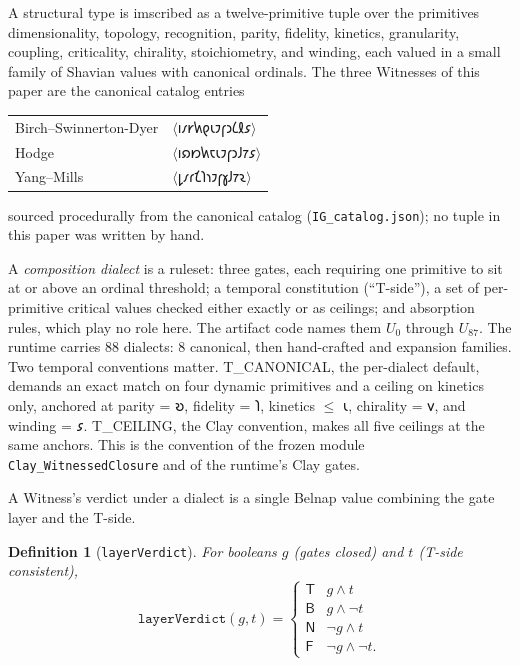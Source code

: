 \documentclass[12pt,a4paper]{article}
\newtheorem{definition}[theorem]{Definition}
\newcommand{\shav}[1]{{\shavfont #1}}
\newcommand{\igtuple}[1]{\ensuremath{\langle}{\shavfont #1}\ensuremath{\rangle}}
\newcommand{\bN}{\textsf{N}}
\newcommand{\bT}{\textsf{T}}
\newcommand{\bF}{\textsf{F}}
\newcommand{\bB}{\textsf{B}}
\begin{document}
A structural type is imscribed as a twelve-primitive tuple over the primitives
dimensionality, topology, recognition, parity, fidelity, kinetics, granularity,
coupling, criticality, chirality, stoichiometry, and winding, each valued in a
small family of Shavian values with canonical ordinals.  The three Witnesses of
this paper are the canonical catalog entries
\begin{center}
\begin{tabular}{ll}
Birch--Swinnerton-Dyer & \igtuple{𐑦𐑥𐑾𐑿𐑞𐑧𐑲𐑝𐑮𐑖𐑙𐑭}\\
Hodge & \igtuple{𐑦𐑸𐑽𐑿𐑱𐑧𐑲𐑝𐑮𐑓𐑳𐑭}\\
Yang--Mills & \igtuple{𐑛𐑥𐑩𐑗𐑐𐑪𐑲𐑝𐑣𐑓𐑳𐑷}
\end{tabular}
\end{center}
sourced procedurally from the canonical catalog (\texttt{IG\_catalog.json});
no tuple in this paper was written by hand.

A \emph{composition dialect} is a ruleset: three gates, each requiring one
primitive to sit at or above an ordinal threshold; a temporal constitution
(``T-side''), a set of per-primitive critical values checked either exactly or
as ceilings; and absorption rules, which play no role here.  The artifact code
names them $U_0$ through $U_{87}$.  The runtime carries
$88$ dialects: $8$ canonical, then hand-crafted and expansion families.  Two
temporal conventions matter.  T\_CANONICAL, the per-dialect default, demands an
exact match on four dynamic primitives and a ceiling on kinetics only, anchored
at parity = \shav{𐑹}, fidelity = \shav{𐑐}, kinetics $\le$ \shav{𐑧},
chirality = \shav{𐑫}, and winding = \shav{𐑭}.  T\_CEILING, the Clay
convention, makes all five ceilings at the same anchors.  This is the convention
of the frozen module \texttt{Clay\_WitnessedClosure} and of the runtime's Clay
gates.

A Witness's verdict under a dialect is a single Belnap value combining the gate
layer and the T-side.

\begin{definition}[\texttt{layerVerdict}]
\label{def:layerverdict}
For booleans $g$ (gates closed) and $t$ (T-side consistent),
\[
\texttt{layerVerdict}(g, t) =
\begin{cases}
\bT & g \wedge t\\
\bB & g \wedge \neg t\\
\bN & \neg g \wedge t\\
\bF & \neg g \wedge \neg t .
\end{cases}
\]
\end{definition}
\end{document}
